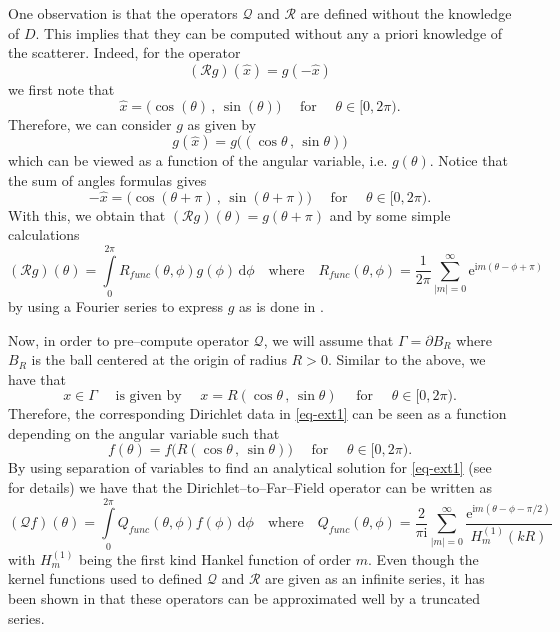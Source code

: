 \documentclass{article}
\numberwithin{equation}{section}
\begin{document}
One observation is that the operators $\mathcal{Q}$ and $\mathcal{R}$ are defined without the knowledge of $D$. This implies that they can be computed without any a priori knowledge of the scatterer. Indeed, for the operator 
$$(\mathcal{R}g)(\hat{x}) = g(-\hat{x})$$
we first note that 
$$\hat x = \big(\cos (\theta) \, , \, \sin (\theta) \big) \quad \text{ for } \quad \theta \in [0, 2\pi).$$
Therefore, we can consider $g$ as given by  
$$g(\hat x) = g\big( (\cos\theta \, , \, \sin \theta) \big)$$ 
which can be viewed as a function of the angular variable, i.e. $g(\theta)$. Notice that the sum of angles formulas gives 
$$- \hat x =  \big(\cos (\theta+\pi) \, , \, \sin (\theta + \pi) \big) \quad \text{ for } \quad \theta \in [0, 2\pi).$$
With this, we obtain that $(\mathcal{R}g)(\theta) = g(\theta+\pi)$ and by some simple calculations  
$$(\mathcal{R} g)(\theta) = \int\limits_0^{2\pi} R_{func} (\theta, \phi) g(\phi)  \,  \text{d}{\phi} \quad \text{where} \quad R_{func}(\theta, \phi) = \frac{1}{2\pi} \sum_{|m| = 0}^{\infty} \text{e}^{\text{i}m(\theta - \phi + \pi)}$$
by using a Fourier series to express $g$ as is done in \cite{nf-fft-dsm}. 

Now, in order to pre--compute operator $\mathcal{Q}$, we will assume that $\Gamma=\partial B_R$ where $B_R$ is the ball centered at the origin of radius $R>0$. Similar to the above, we have that 
$$ x \in \Gamma \quad \text{ is given by } \quad x=R (\cos \theta \, , \, \sin \theta) \quad \text{ for } \quad \theta \in [0, 2\pi).$$
Therefore, the corresponding Dirichlet data in \eqref{eq-ext1} can be seen as a function depending on the angular variable such that 
$$f(\theta) = f\big( R (\cos\theta \, , \, \sin \theta) \big) \quad \text{ for } \quad \theta \in [0, 2\pi).$$
By using separation of variables to find an analytical solution for \eqref{eq-ext1} (see \cite{postdocpaper} for details) we have that the Dirichlet--to--Far--Field operator can be written as 
$$ (\mathcal{Q} f)(\theta) = \int\limits_0^{2\pi} Q_{func} (\theta, \phi) f(\phi)  \,  \text{d}{\phi} \quad \text{where} \quad Q_{func} (\theta, \phi) = \frac{ 2 }{\pi \text{i}} \sum_{|m| = 0}^{\infty} \frac{\text{e}^{\text{i}m(\theta - \phi - \pi/2)}}{H^{(1)}_{m}(kR)}$$
with $H^{(1)}_{m}$ being the first kind Hankel function of order $m$. Even though the kernel functions used to defined $\mathcal{Q}$ and $\mathcal{R}$ are given as an infinite series, it has been shown in \cite{nf-fft-dsm,postdocpaper} that these operators can be approximated well by a truncated series. 
\end{document}
